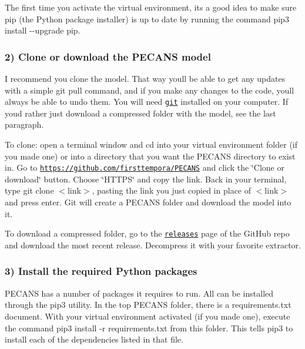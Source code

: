 The first time you activate the virtual environment, it\textquotesingle{}s a good idea to make sure {\ttfamily pip} (the Python package installer) is up to date by running the command {\ttfamily pip3 install -\/-\/upgrade pip}.

\subsubsection*{2) Clone or download the P\+E\+C\+A\+NS model}

I recommend you clone the model. That way you\textquotesingle{}ll be able to get any updates with a simple {\ttfamily git pull} command, and if you make any changes to the code, you\textquotesingle{}ll always be able to undo them. You will need \href{https://git-scm.com/downloads}{\tt git} installed on your computer. If you\textquotesingle{}d rather just download a compressed folder with the model, see the last paragraph.

To clone\+: open a terminal window and {\ttfamily cd} into your virtual environment folder (if you made one) or into a directory that you want the P\+E\+C\+A\+NS directory to exist in. Go to \href{https://github.com/firsttempora/PECANS}{\tt https\+://github.\+com/firsttempora/\+P\+E\+C\+A\+NS} and click the \char`\"{}\+Clone or download\char`\"{} button. Choose \char`\"{}\+H\+T\+T\+P\+S\char`\"{} and copy the link. Back in your terminal, type {\ttfamily git clone $<$link$>$}, pasting the link you just copied in place of {\ttfamily $<$link$>$} and press {\ttfamily enter}. Git will create a P\+E\+C\+A\+NS folder and download the model into it.

To download a compressed folder, go to the \href{https://github.com/firsttempora/PECANS/releases}{\tt releases} page of the Git\+Hub repo and download the most recent release. Decompress it with your favorite extractor.

\subsubsection*{3) Install the required Python packages}

P\+E\+C\+A\+NS has a number of packages it requires to run. All can be installed through the {\ttfamily pip3} utility. In the top P\+E\+C\+A\+NS folder, there is a {\ttfamily requirements.\+txt} document. With your virtual environment activated (if you made one), execute the command {\ttfamily pip3 install -\/r requirements.\+txt} from this folder. This tells {\ttfamily pip3} to install each of the dependencies listed in that file.

